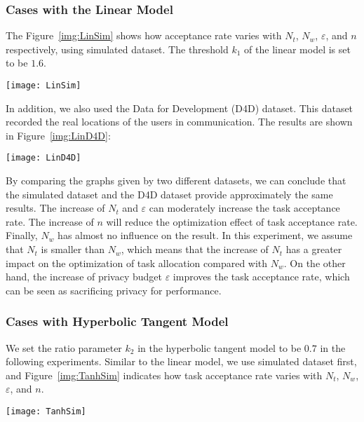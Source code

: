 \subsubsection{Cases with the Linear Model}
The Figure~\ref{img:LinSim} shows how acceptance rate varies with $N_t$, $N_w$, $\varepsilon$, and $n$ respectively, using simulated dataset. The threshold $k_1$ of the linear model is set to be $1.6$.

\begin{figure*}
\texttt{[image: LinSim]}
\caption{Linear Model \& Simulated Dataset}
\label{img:LinSim}
\end{figure*}

In addition, we also used the Data for Development (D4D) dataset. This dataset recorded the real locations of the users in communication. The results are shown in Figure~\ref{img:LinD4D}:

\begin{figure*}
\texttt{[image: LinD4D]}
\caption{Linear Model \& D4D Dataset}
\label{img:LinD4D}
\end{figure*}

By comparing the graphs given by two different datasets, we can conclude that the simulated dataset and the D4D dataset provide approximately the same results. The increase of $N_t$ and $\varepsilon$ can moderately increase the task acceptance rate. The increase of $n$ will reduce the optimization effect of task acceptance rate. Finally, $N_w$ has almost no influence on the result. In this experiment, we assume that $N_t$ is smaller than $N_w$, which means that the increase of $N_t$ has a greater impact on the optimization of task allocation compared with $N_w$. On the other hand, the increase of privacy budget $\varepsilon$ improves the task acceptance rate, which can be seen as sacrificing privacy for performance.

\subsubsection{Cases with Hyperbolic Tangent Model}
We set the ratio parameter $k_2$ in the hyperbolic tangent model to be $0.7$ in the following experiments. Similar to the linear model, we use simulated dataset first, and Figure~\ref{img:TanhSim} indicates how task acceptance rate varies with $N_t$, $N_w$, $\varepsilon$, and $n$.

\begin{figure*}
\texttt{[image: TanhSim]}
\caption{Hyperbolic Tangent Model \& Simulated Dataset}
\label{img:TanhSim}
\end{figure*}

